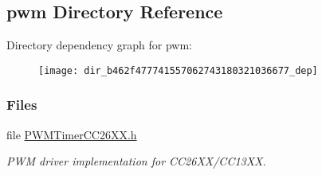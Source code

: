 \subsection{pwm Directory Reference}
\label{dir_b462f477741557062743180321036677}
Directory dependency graph for pwm\+:
\nopagebreak
\begin{figure}[H]
\begin{center}
\leavevmode
\texttt{[image: dir\_b462f477741557062743180321036677\_dep]}
\end{center}
\end{figure}
\subsubsection*{Files}
\begin{DoxyCompactItemize}
\item 
file \hyperlink{_p_w_m_timer_c_c26_x_x_8h}{P\+W\+M\+Timer\+C\+C26\+X\+X.\+h}
\begin{DoxyCompactList}\small\item\em P\+W\+M driver implementation for C\+C26\+X\+X/\+C\+C13\+X\+X. \end{DoxyCompactList}\end{DoxyCompactItemize}
